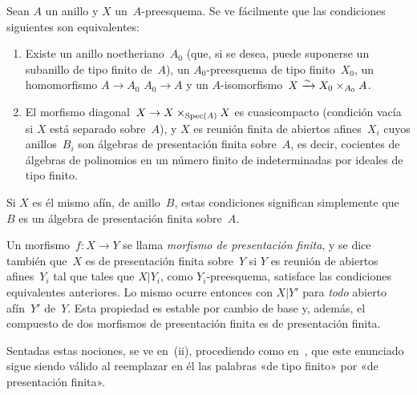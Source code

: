 \begin{remarques}
\label{VIII.3.6}
Sean $A$ un anillo y $X$ un~$A$-preesquema. Se ve fácilmente que
las condiciones siguientes son equivalentes:

\begin{enumerate}
\item[(i)] Existe un anillo noetheriano~$A_{0}$ (que, si se desea, puede
suponerse un subanillo de tipo finito de~$A$), un $A_{0}$-preesquema de tipo
finito~$X_{0}$, un homomorfismo
{$A\to A_{0}$}
{$A_0\to A$}
y un $A$-isomorfismo~$X\xrightarrow{\sim} X_{0}\times_{A_{0}}A$.
\item[(ii)] El morfismo diagonal~$X\to X\times_{\operatorname{Spec}(A)}X$ es cuasicompacto
(condición vacía si $X$ está separado sobre~$A$), y $X$ es reunión finita de
abiertos afines~$X_{i}$ cuyos anillos~$B_{i}$ son álgebras de presentación
finita sobre~$A$, es decir, cocientes de álgebras de polinomios en un número
finito de indeterminadas por ideales de tipo finito.
\end{enumerate}

Si $X$ es él mismo afín, de anillo~$B$, estas condiciones significan
simplemente que~$B$ es un álgebra de presentación finita sobre~$A$.

Un morfismo~$f\colon X\to Y$ se llama \emph{morfismo de presentación
finita},
%
y se dice también que~$X$ es de presentación finita sobre~$Y$ si $Y$ es
reunión de abiertos afines~$Y_{i}$
{tal que}
{tales que}
$X|Y_{i}$, como $Y_{i}$-preesquema, satisface las condiciones equivalentes
anteriores. Lo mismo ocurre entonces con $X|Y'$ para \emph{todo} abierto
afín~$Y'$ de~$Y$. Esta propiedad es estable por cambio de base y, además, el
compuesto de dos morfismos de presentación finita es de presentación finita.

Sentadas estas nociones, se ve en~(ii), procediendo como
en~, que este enunciado sigue siendo válido al reemplazar en
él las palabras «de tipo finito» por «de presentación finita».
\end{remarques}
